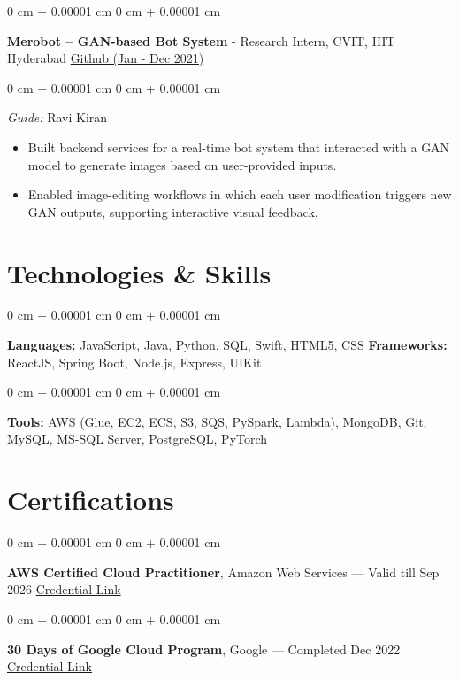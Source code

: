 \documentclass[10pt, a4paper]{article}
\newenvironment{highlights}{
    \begin{itemize}[
        topsep=0.10 cm,
        parsep=0.10 cm,
        partopsep=0pt,
        itemsep=0pt,
        leftmargin=0 cm + 10pt
    ]
}{
    \end{itemize}
} %
\newenvironment{onecolentry}{
    \begin{adjustwidth}{
        0 cm + 0.00001 cm
    }{
        0 cm + 0.00001 cm
    }
}{
    \end{adjustwidth}
} %
\newenvironment{twocolentry}[2][]{
    \onecolentry
    \def\secondColumn{#2}
    \setcolumnwidth{\fill, 6.0 cm}
    \begin{paracol}{2}
}{
    \switchcolumn \raggedleft \secondColumn
    \end{paracol}
    \endonecolentry
} %
\begin{document}
        \begin{twocolentry}{
            \href{https://github.com/ammrit2312/Merobot/tree/master}{Github (Jan - Dec 2021)}
        }
            \textbf{Merobot – GAN-based Bot System} - Research Intern, CVIT, IIIT Hyderabad\end{twocolentry}

        \vspace{0.10 cm}
        \begin{onecolentry}
            \textit{Guide:} Ravi Kiran\\
            \begin{highlights}
                \item Built backend services for a real-time bot system that interacted with a GAN model to generate images based on user-provided inputs.
                \item Enabled image-editing workflows in which each user modification triggers new GAN outputs, supporting interactive visual feedback.
            \end{highlights}
        \end{onecolentry}
    
    \section{Technologies \& Skills}
        \begin{onecolentry}
            \textbf{Languages:} JavaScript, Java, Python, SQL, Swift, HTML5, CSS \quad \textbf{Frameworks:} ReactJS, Spring Boot, Node.js, Express, UIKit
        \end{onecolentry}
        \begin{onecolentry}
            \textbf{Tools:} AWS (Glue, EC2, ECS, S3, SQS, PySpark, Lambda), MongoDB, Git, MySQL, MS-SQL Server, PostgreSQL, PyTorch
        \end{onecolentry}

    \section{Certifications}

    \begin{onecolentry}
        \textbf{AWS Certified Cloud Practitioner}, Amazon Web Services — Valid till Sep 2026 \hfill \href{https://cp.certmetrics.com/amazon/en/public/verify/credential/21NY0Y6C714E1JSB}{Credential Link}
    \end{onecolentry}
    
    \begin{onecolentry}
        \textbf{30 Days of Google Cloud Program}, Google — Completed Dec 2022 \hfill \href{https://drive.google.com/file/d/131IwLvWr8a6YWLYd5ILZ6kvacsKfmkWc/view}{Credential Link}
    \end{onecolentry}
    
\end{document}

